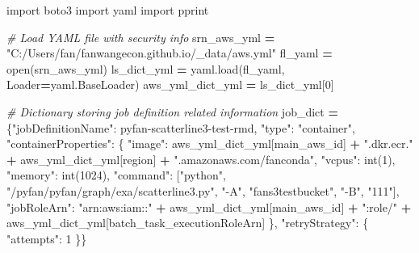 \documentclass[
]{book}
\newenvironment{Shaded}{\begin{snugshade}}{\end{snugshade}}
\newcommand{\BuiltInTok}[1]{#1}
\newcommand{\CommentTok}[1]{\textcolor[rgb]{0.56,0.35,0.01}{\textit{#1}}}
\newcommand{\DecValTok}[1]{\textcolor[rgb]{0.00,0.00,0.81}{#1}}
\newcommand{\ImportTok}[1]{#1}
\newcommand{\NormalTok}[1]{#1}
\newcommand{\OperatorTok}[1]{\textcolor[rgb]{0.81,0.36,0.00}{\textbf{#1}}}
\newcommand{\StringTok}[1]{\textcolor[rgb]{0.31,0.60,0.02}{#1}}
\begin{document}
\begin{Shaded}
\begin{Highlighting}[]
\ImportTok{import}\NormalTok{ boto3}
\ImportTok{import}\NormalTok{ yaml}
\ImportTok{import}\NormalTok{ pprint}

\CommentTok{\# Load YAML file with security info}
\NormalTok{srn\_aws\_yml }\OperatorTok{=} \StringTok{"C:/Users/fan/fanwangecon.github.io/\_data/aws.yml"}
\NormalTok{fl\_yaml }\OperatorTok{=} \BuiltInTok{open}\NormalTok{(srn\_aws\_yml)}
\NormalTok{ls\_dict\_yml }\OperatorTok{=}\NormalTok{ yaml.load(fl\_yaml, Loader}\OperatorTok{=}\NormalTok{yaml.BaseLoader)}
\NormalTok{aws\_yml\_dict\_yml }\OperatorTok{=}\NormalTok{ ls\_dict\_yml[}\DecValTok{0}\NormalTok{]}

\CommentTok{\# Dictionary storing job definition related information}
\NormalTok{job\_dict }\OperatorTok{=}\NormalTok{ \{}\StringTok{"jobDefinitionName"}\NormalTok{: }\StringTok{\textquotesingle{}pyfan{-}scatterline3{-}test{-}rmd\textquotesingle{}}\NormalTok{,}
            \StringTok{"type"}\NormalTok{: }\StringTok{"container"}\NormalTok{,}
            \StringTok{"containerProperties"}\NormalTok{: \{}
                \StringTok{"image"}\NormalTok{: aws\_yml\_dict\_yml[}\StringTok{\textquotesingle{}main\_aws\_id\textquotesingle{}}\NormalTok{] }\OperatorTok{+} \StringTok{".dkr.ecr."} \OperatorTok{+}
\NormalTok{                         aws\_yml\_dict\_yml[}\StringTok{\textquotesingle{}region\textquotesingle{}}\NormalTok{] }\OperatorTok{+} \StringTok{".amazonaws.com/fanconda"}\NormalTok{,}
                \StringTok{"vcpus"}\NormalTok{: }\BuiltInTok{int}\NormalTok{(}\DecValTok{1}\NormalTok{),}
                \StringTok{"memory"}\NormalTok{: }\BuiltInTok{int}\NormalTok{(}\DecValTok{1024}\NormalTok{),}
                \StringTok{"command"}\NormalTok{: [}\StringTok{"python"}\NormalTok{,}
                            \StringTok{"/pyfan/pyfan/graph/exa/scatterline3.py"}\NormalTok{,}
                            \StringTok{"{-}A"}\NormalTok{, }\StringTok{"fans3testbucket"}\NormalTok{,}
                            \StringTok{"{-}B"}\NormalTok{, }\StringTok{"111"}\NormalTok{],}
                \StringTok{"jobRoleArn"}\NormalTok{: }\StringTok{"arn:aws:iam::"} \OperatorTok{+}\NormalTok{ aws\_yml\_dict\_yml[}\StringTok{\textquotesingle{}main\_aws\_id\textquotesingle{}}\NormalTok{] }\OperatorTok{+}
                              \StringTok{":role/"} \OperatorTok{+}\NormalTok{ aws\_yml\_dict\_yml[}\StringTok{\textquotesingle{}batch\_task\_executionRoleArn\textquotesingle{}}\NormalTok{]}
\NormalTok{            \},}
            \StringTok{"retryStrategy"}\NormalTok{: \{}
                \StringTok{"attempts"}\NormalTok{: }\DecValTok{1}
\NormalTok{            \}\}}


\end{Highlighting}
\end{Shaded}
\end{document}
